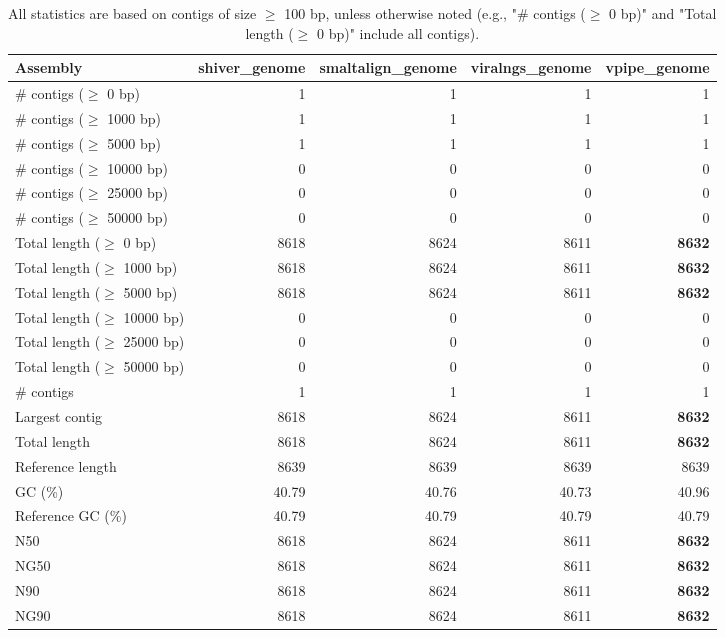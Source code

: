 \documentclass[12pt,a4paper]{article}
\begin{document}
\begin{table}[ht]
\begin{center}
\caption{All statistics are based on contigs of size $\geq$ 100 bp, unless otherwise noted (e.g., "\# contigs ($\geq$ 0 bp)" and "Total length ($\geq$ 0 bp)" include all contigs).}
\begin{tabular}{|l*{4}{|r}|}
\hline
Assembly & shiver\_genome & smaltalign\_genome & viralngs\_genome & vpipe\_genome \\ \hline
\# contigs ($\geq$ 0 bp) & 1 & 1 & 1 & 1 \\ \hline
\# contigs ($\geq$ 1000 bp) & 1 & 1 & 1 & 1 \\ \hline
\# contigs ($\geq$ 5000 bp) & 1 & 1 & 1 & 1 \\ \hline
\# contigs ($\geq$ 10000 bp) & 0 & 0 & 0 & 0 \\ \hline
\# contigs ($\geq$ 25000 bp) & 0 & 0 & 0 & 0 \\ \hline
\# contigs ($\geq$ 50000 bp) & 0 & 0 & 0 & 0 \\ \hline
Total length ($\geq$ 0 bp) & 8618 & 8624 & 8611 & {\bf 8632} \\ \hline
Total length ($\geq$ 1000 bp) & 8618 & 8624 & 8611 & {\bf 8632} \\ \hline
Total length ($\geq$ 5000 bp) & 8618 & 8624 & 8611 & {\bf 8632} \\ \hline
Total length ($\geq$ 10000 bp) & 0 & 0 & 0 & 0 \\ \hline
Total length ($\geq$ 25000 bp) & 0 & 0 & 0 & 0 \\ \hline
Total length ($\geq$ 50000 bp) & 0 & 0 & 0 & 0 \\ \hline
\# contigs & 1 & 1 & 1 & 1 \\ \hline
Largest contig & 8618 & 8624 & 8611 & {\bf 8632} \\ \hline
Total length & 8618 & 8624 & 8611 & {\bf 8632} \\ \hline
Reference length & 8639 & 8639 & 8639 & 8639 \\ \hline
GC (\%) & 40.79 & 40.76 & 40.73 & 40.96 \\ \hline
Reference GC (\%) & 40.79 & 40.79 & 40.79 & 40.79 \\ \hline
N50 & 8618 & 8624 & 8611 & {\bf 8632} \\ \hline
NG50 & 8618 & 8624 & 8611 & {\bf 8632} \\ \hline
N90 & 8618 & 8624 & 8611 & {\bf 8632} \\ \hline
NG90 & 8618 & 8624 & 8611 & {\bf 8632} \\ \hline

\end{tabular}
\end{center}
\end{table}
\end{document}
